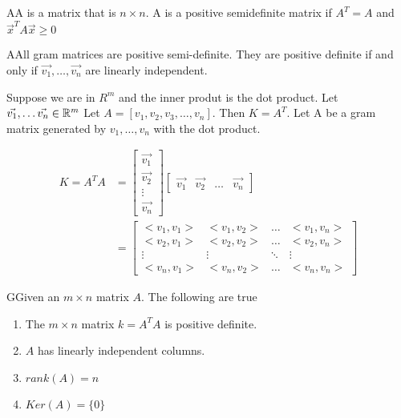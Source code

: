   \begin{definition}
    AA is a matrix that is $n\times n$. A is a positive semidefinite matrix if $A^{T}=A$ and $\vec{x}^{T}A\vec{x}\ge 0$
  \end{definition}

  \begin{theorem}
    AAll gram matrices are positive semi-definite. They are positive definite if and only if $\vec{v_1},\ldots,\vec{v_n}$ are linearly independent.
  \end{theorem}

  Suppose we are in $R^{m}$ and the inner produt is the dot product. Let $\vec{v_1},\ldots \vec{v_n}\in\mathbb{R}^{m}$\newline
  Let $A=[v_1,v_2,v_3,\ldots,v_n]$. Then $K=A^{T}$. Let A be a gram matrix generated by $v_1,\ldots,v_n$ with the dot product.

  \begin{align}
    K=A^{T}A&=\begin{bmatrix} \vec{v_1}\\\vec{v_2}\\ \vdots\\\vec{v_n} \end{bmatrix}
    \begin{bmatrix} \vec{v_1}&\vec{v_2}&\ldots&\vec{v_n} \end{bmatrix} \\
                             &=
    \begin{bmatrix} 
      <v_1,v_1>&<v_1,v_2>&\ldots&<v_1,v_n>\\
      <v_2,v_1>&<v_2,v_2>&\ldots&<v_2,v_n>\\
      \vdots&\vdots&\ddots&\vdots\\
      <v_n,v_1>&<v_n,v_2>&\ldots&<v_n,v_n>
    \end{bmatrix} 
  \end{align}

  \begin{prop}
    GGiven an $m\times n$ matrix $A$. The following are true
    \begin{enumerate}
      \item The $m\times n$ matrix $k=A^{T}A$ is positive definite.
      \item $A$ has linearly independent columns.
      \item $rank (A)=n$
      \item $Ker(A)=\{0\}$
    \end{enumerate}
  \end{prop}

